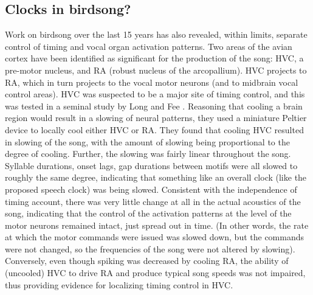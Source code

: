 \documentclass[output=paper,
modfonts
]{LSP/langsci}
\begin{document}
\subsection{Clocks in birdsong?}

Work on birdsong over the last 15 years has also revealed, within limits, separate control of timing and vocal organ activation patterns. Two areas of the avian cortex have been identified as significant  for the production of the song: HVC, a pre-motor nucleus, and RA (robust nucleus of the arcopallium).  HVC projects to RA, which in turn projects to the vocal motor neurons (and to midbrain vocal control areas). HVC was suspected to be a major site of timing control, and this was tested in a seminal study by Long and Fee \citeyearpar{Long2008}. Reasoning that cooling a brain region would result in a slowing of neural patterns, they used a miniature Peltier device to locally cool either HVC or RA. They found that cooling HVC resulted in slowing of the song, with the amount of slowing being proportional to the degree of cooling.  Further, the slowing was fairly linear throughout the song. Syllable durations, onset lags, gap durations between motifs were all slowed to roughly the same degree, indicating that something like an overall clock (like the proposed speech clock) was being slowed. Consistent with the independence of timing account, there was very little change at all in the actual acoustics of the song, indicating that the control of the activation patterns at the level of the motor neurons remained intact, just spread out in time. (In other words, the rate at which the motor commands were issued was slowed down, but the commands were not changed, so the frequencies of the song were not altered by slowing). Conversely, even though spiking was decreased by cooling RA, the ability of (uncooled) HVC to drive RA and produce typical song speeds was not impaired, thus providing evidence for localizing timing control in HVC.
\end{document}
